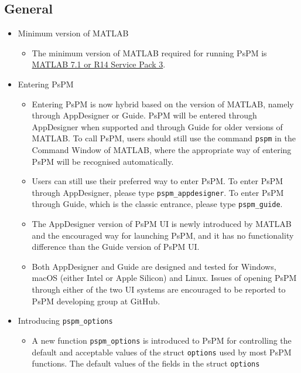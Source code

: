 \documentclass[english]{article}
\numberwithin{equation}{section}
\numberwithin{figure}{section}
\begin{document}
\subsection*{General}
	\begin{itemize}
		\item Minimum version of MATLAB
		\begin{itemize}
			\item The minimum version of MATLAB required for running PsPM is 
						\href{https://uk.mathworks.com/content/dam/mathworks/mathworks-dot-com/support/
						sysreq/files/SystemRequirements-Release14-ServicePack3_SupportedCompilers.pdf}
						{MATLAB 7.1 or R14 Service Pack 3}.
		\end{itemize}
		\item Entering PsPM
		\begin{itemize}
			\item Entering PsPM is now hybrid based on the version of MATLAB, namely through 
						AppDesigner or Guide. PsPM will be entered through AppDesigner when supported 
						and through Guide for older versions of MATLAB. To call PsPM, users should 
						still use the command \texttt{pspm} in the Command Window of MATLAB, where 
						the appropriate way of entering PsPM will be recognised automatically.
			\item Users can still use their preferred way to enter PsPM. To enter PsPM through 
						AppDesigner, please type \texttt{pspm\_appdesigner}. To enter PsPM through 
						Guide, which is the classic entrance, please type \texttt{pspm\_guide}.
			\item The AppDesigner version of PsPM UI is newly introduced by MATLAB and the 
						encouraged way for launching PsPM, and it has no functionality difference 
						than the Guide version of PsPM UI.
			\item Both AppDesigner and Guide are designed and tested for Windows, macOS (either 
			Intel or Apple Silicon) and Linux. Issues of opening PsPM through either of the two 
			UI systems are encouraged to be reported to PsPM developing group at GitHub.
		\end{itemize}
		\item Introducing \texttt{pspm\_options}
		\begin{itemize}
			\item A new function \texttt{pspm\_options} is introduced to PsPM for controlling 
						the default and acceptable values of the struct \texttt{options} used by most 
						PsPM functions. The default values of the fields in the struct \texttt{options} 

\end{itemize}
\end{itemize}
\end{document}
